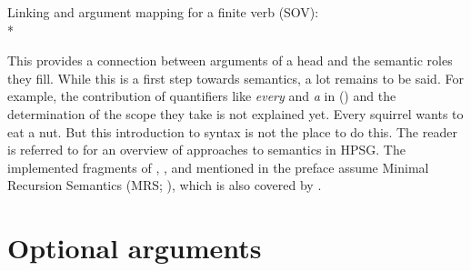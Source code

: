 \ex Linking and argument mapping for a  finite verb (SOV):\\*
\zl

\noindent
This provides a connection between arguments of a head and the semantic roles they fill. While this
is a first step towards semantics, a lot remains to be said. For example, the contribution of
quantifiers like \emph{every} and \emph{a} in () and the determination of the scope they take is not explained yet. 
\ea
Every squirrel wants to eat a nut.
\z
But this introduction to syntax is not the place to do this. The reader is referred to
 for an overview of approaches to semantics in HPSG. The implemented fragments of
, ,  and  mentioned in the preface assume Minimal Recursion Semantics (MRS; \citealt{CFPS2005a}), which is
also covered by \citet[Section~6.1]{KoenigRichter2021a}.

\section{Optional arguments}
\label{sec-optional-arguments}

